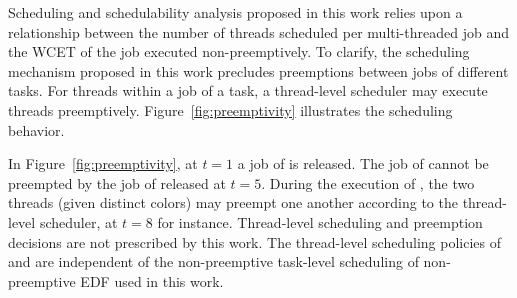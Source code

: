 Scheduling and schedulability analysis proposed in this work relies upon
a relationship between the number of threads scheduled per
multi-threaded job and the WCET of the job executed
non-preemptively. To clarify, the scheduling mechanism proposed in
this work precludes preemptions between jobs of different tasks. For
threads within a job of a task, a thread-level scheduler may execute
threads preemptively. Figure~\ref{fig:preemptivity} illustrates the
scheduling behavior.

In Figure~\ref{fig:preemptivity}, at ${t = 1}$ a job of  is
released. The job of  cannot be preempted by the job of  
released at ${t = 5}$. During the execution of , the two
threads (given distinct colors) may preempt one another according to
the thread-level scheduler, at ${t = 8}$ for instance. Thread-level
scheduling and preemption decisions are not prescribed by this
work. The thread-level scheduling policies of  and 
are independent of the non-preemptive task-level scheduling of
non-preemptive EDF used in this work. 

